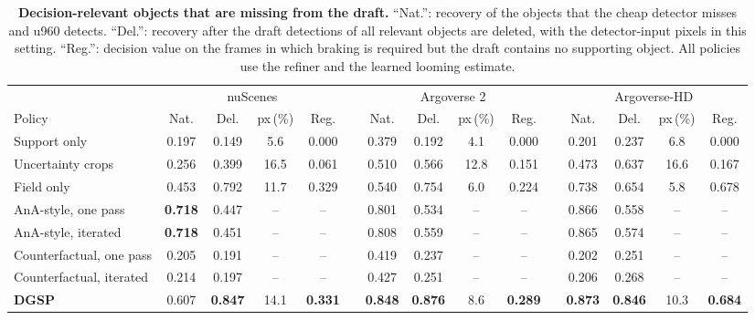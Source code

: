 \documentclass[10pt,letterpaper]{article}
\newcommand{\method}{DGSP\xspace}
\newcommand{\best}[1]{\textbf{#1}}
\newcommand{\oursrow}{\rowcolor{oursbg}}
\newcommand{\na}{--}
\theoremstyle{remark}
\theoremstyle{plain}
\theoremstyle{definition}
\begin{document}
\begin{table}[!tbp]
\centering
\caption{\textbf{Decision-relevant objects that are missing from the draft.} ``Nat.'': recovery of the objects that the cheap detector misses and u960 detects. ``Del.'': recovery after the draft detections of all relevant objects are deleted, with the detector-input pixels in this setting. ``Reg.'': decision value on the frames in which braking is required but the draft contains no supporting object. All policies use the refiner and the learned looming estimate.}
\label{tab:missed}
\footnotesize
\setlength{\tabcolsep}{3.4pt}
\begin{tabular}{@{}lcccccccccccccc@{}}
\toprule
 & \multicolumn{4}{c}{nuScenes} & & \multicolumn{4}{c}{Argoverse 2} & & \multicolumn{4}{c}{Argoverse-HD} \\
\cmidrule(lr){2-5}\cmidrule(lr){7-10}\cmidrule(l){12-15}
Policy & Nat. & Del. & px\,(\%) & Reg. & & Nat. & Del. & px\,(\%) & Reg. & & Nat. & Del. & px\,(\%) & Reg. \\
\midrule
Support only & 0.197 & 0.149 & 5.6 & 0.000 &  & 0.379 & 0.192 & 4.1 & 0.000 &  & 0.201 & 0.237 & 6.8 & 0.000 \\
Uncertainty crops & 0.256 & 0.399 & 16.5 & 0.061 &  & 0.510 & 0.566 & 12.8 & 0.151 &  & 0.473 & 0.637 & 16.6 & 0.167 \\
Field only & 0.453 & 0.792 & 11.7 & 0.329 &  & 0.540 & 0.754 & 6.0 & 0.224 &  & 0.738 & 0.654 & 5.8 & 0.678 \\
AnA-style, one pass & \best{0.718} & 0.447 & \na & \na &  & 0.801 & 0.534 & \na & \na &  & 0.866 & 0.558 & \na & \na \\
AnA-style, iterated & \best{0.718} & 0.451 & \na & \na &  & 0.808 & 0.559 & \na & \na &  & 0.865 & 0.574 & \na & \na \\
Counterfactual, one pass & 0.205 & 0.191 & \na & \na &  & 0.419 & 0.237 & \na & \na &  & 0.202 & 0.251 & \na & \na \\
Counterfactual, iterated & 0.214 & 0.197 & \na & \na &  & 0.427 & 0.251 & \na & \na &  & 0.206 & 0.268 & \na & \na \\
\oursrow \textbf{\method} & 0.607 & \best{0.847} & 14.1 & \best{0.331} &  & \best{0.848} & \best{0.876} & 8.6 & \best{0.289} &  & \best{0.873} & \best{0.846} & 10.3 & \best{0.684} \\
\bottomrule
\end{tabular}
\end{table}
\end{document}
